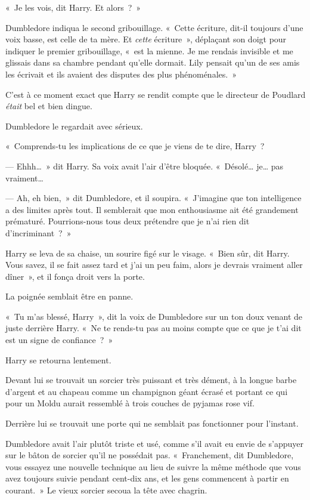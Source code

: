 «~Je les vois, dit Harry. Et alors~?~»

Dumbledore indiqua le second gribouillage. «~Cette écriture, dit-il toujours d'une voix basse, est celle de ta mère. Et \emph{cette} écriture~», déplaçant son doigt pour indiquer le premier gribouillage, «~est la mienne. Je me rendais invisible et me glissais dans sa chambre pendant qu'elle dormait. Lily pensait qu'un de ses amis les écrivait et ils avaient des disputes des plus phénoménales.~»

C'est à ce moment exact que Harry se rendit compte que le directeur de Poudlard \emph{était} bel et bien dingue.

Dumbledore le regardait avec sérieux.

«~Comprends-tu les implications de ce que je viens de te dire, Harry~?

--- Ehhh…~» dit Harry. Sa voix avait l'air d'être bloquée. «~Désolé… je… pas vraiment…

--- Ah, eh bien,~» dit Dumbledore, et il soupira. «~J'imagine que ton intelligence a des limites après tout. Il semblerait que mon enthousiasme ait été grandement prématuré. Pourrions-nous tous deux prétendre que je n'ai rien dit d'incriminant~?~»

Harry se leva de sa chaise, un sourire figé sur le visage. «~Bien sûr, dit Harry. Vous savez, il se fait assez tard et j'ai un peu faim, alors je devrais vraiment aller dîner~», et il fonça droit vers la porte.

La poignée semblait être en panne.

«~Tu m'as blessé, Harry~», dit la voix de Dumbledore sur un ton doux venant de juste derrière Harry. «~Ne te rends-tu pas au moins compte que ce que je t'ai dit est un signe de confiance~?~»

Harry se retourna lentement.

Devant lui se trouvait un sorcier très puissant et très dément, à la longue barbe d'argent et au chapeau comme un champignon géant écrasé et portant ce qui pour un Moldu aurait ressemblé à trois couches de pyjamas rose vif.

Derrière lui se trouvait une porte qui ne semblait pas fonctionner pour l'instant.

Dumbledore avait l'air plutôt triste et usé, comme s'il avait eu envie de s'appuyer sur le bâton de sorcier qu'il ne possédait pas. «~Franchement, dit Dumbledore, vous essayez une nouvelle technique au lieu de suivre la même méthode que vous avez toujours suivie pendant cent-dix ans, et les gens commencent à partir en courant.~» Le vieux sorcier secoua la tête avec chagrin.

